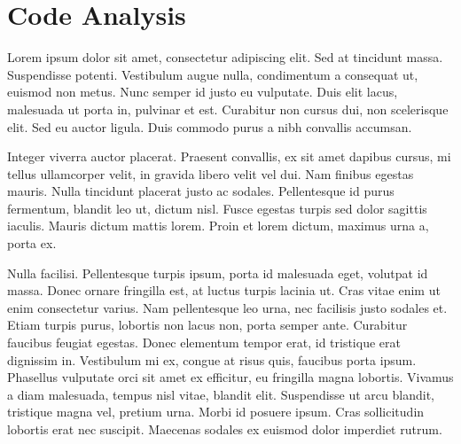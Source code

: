 \section{Code Analysis}
Lorem ipsum dolor sit amet, consectetur adipiscing elit. Sed at tincidunt massa. Suspendisse potenti. Vestibulum augue nulla, condimentum a consequat ut, euismod non metus. Nunc semper id justo eu vulputate. Duis elit lacus, malesuada ut porta in, pulvinar et est. Curabitur non cursus dui, non scelerisque elit. Sed eu auctor ligula. Duis commodo purus a nibh convallis accumsan.

Integer viverra auctor placerat. Praesent convallis, ex sit amet dapibus cursus, mi tellus ullamcorper velit, in gravida libero velit vel dui. Nam finibus egestas mauris. Nulla tincidunt placerat justo ac sodales. Pellentesque id purus fermentum, blandit leo ut, dictum nisl. Fusce egestas turpis sed dolor sagittis iaculis. Mauris dictum mattis lorem. Proin et lorem dictum, maximus urna a, porta ex.

Nulla facilisi. Pellentesque turpis ipsum, porta id malesuada eget, volutpat id massa. Donec ornare fringilla est, at luctus turpis lacinia ut. Cras vitae enim ut enim consectetur varius. Nam pellentesque leo urna, nec facilisis justo sodales et. Etiam turpis purus, lobortis non lacus non, porta semper ante. Curabitur faucibus feugiat egestas. Donec elementum tempor erat, id tristique erat dignissim in. Vestibulum mi ex, congue at risus quis, faucibus porta ipsum. Phasellus vulputate orci sit amet ex efficitur, eu fringilla magna lobortis. Vivamus a diam malesuada, tempus nisl vitae, blandit elit. Suspendisse ut arcu blandit, tristique magna vel, pretium urna. Morbi id posuere ipsum. Cras sollicitudin lobortis erat nec suscipit. Maecenas sodales ex euismod dolor imperdiet rutrum.

